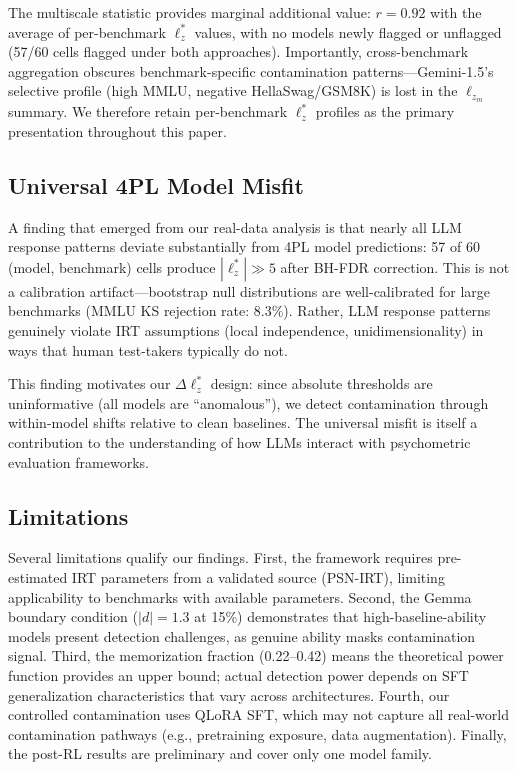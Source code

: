 \documentclass[11pt,a4paper]{article}
\begin{document}
The multiscale statistic provides marginal additional value: $r=0.92$ with the average of per-benchmark $\ell_z^*$ values, with no models newly flagged or unflagged (57/60 cells flagged under both approaches).
Importantly, cross-benchmark aggregation obscures benchmark-specific contamination patterns---Gemini-1.5's selective profile (high MMLU, negative HellaSwag/GSM8K) is lost in the $\ell_{z_m}$ summary.
We therefore retain per-benchmark $\ell_z^*$ profiles as the primary presentation throughout this paper.

\subsection{Universal 4PL Model Misfit}
\label{sec:universal-misfit}

A finding that emerged from our real-data analysis is that nearly all LLM response patterns deviate substantially from 4PL model predictions: 57 of 60 (model, benchmark) cells produce $|\ell_z^*| \gg 5$ after BH-FDR correction.
This is not a calibration artifact---bootstrap null distributions are well-calibrated for large benchmarks (MMLU KS rejection rate: 8.3\%).
Rather, LLM response patterns genuinely violate IRT assumptions (local independence, unidimensionality) in ways that human test-takers typically do not.

This finding motivates our $\Delta\ell_z^*$ design: since absolute thresholds are uninformative (all models are ``anomalous''), we detect contamination through within-model shifts relative to clean baselines.
The universal misfit is itself a contribution to the understanding of how LLMs interact with psychometric evaluation frameworks.

\subsection{Limitations}

Several limitations qualify our findings.
First, the framework requires pre-estimated IRT parameters from a validated source (PSN-IRT), limiting applicability to benchmarks with available parameters.
Second, the Gemma boundary condition ($|d|=1.3$ at 15\%) demonstrates that high-baseline-ability models present detection challenges, as genuine ability masks contamination signal.
Third, the memorization fraction (0.22--0.42) means the theoretical power function provides an upper bound; actual detection power depends on SFT generalization characteristics that vary across architectures.
Fourth, our controlled contamination uses QLoRA SFT, which may not capture all real-world contamination pathways (e.g., pretraining exposure, data augmentation).
Finally, the post-RL results are preliminary and cover only one model family.
\end{document}
